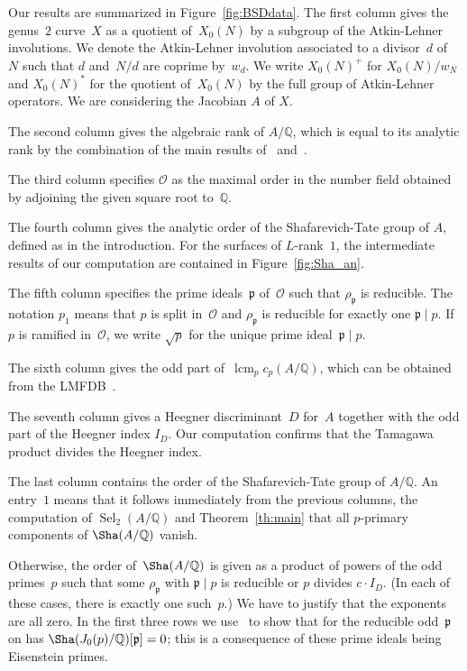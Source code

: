 \documentclass{amsart}
\newcommand{\Q}{{\mathbb{Q}}}
\newcommand{\pfr}{{\mathfrak{p}}}
\newcommand{\Ocal}{{\mathcal{O}}}
\newcommand{\Sel}{\operatorname{Sel}}
\newcommand{\lcm}{\operatorname{lcm}}
\begin{document}
	Our results are summarized in Figure~\ref{fig:BSDdata}. The first column
	gives the genus~$2$ curve~$X$ as a quotient of~$X_0(N)$ by a subgroup of the Atkin-Lehner
	involutions. We denote the Atkin-Lehner involution associated to
	a divisor~$d$ of~$N$ such that $d$ and~$N/d$ are coprime by~$w_d$.
	We write $X_0(N)^+$ for $X_0(N)/w_N$ and $X_0(N)^*$ for the
	quotient of~$X_0(N)$ by the full group of Atkin-Lehner operators.
	We are considering the Jacobian $A$ of $X$.
	
	The second column gives the algebraic rank of $A/\Q$, which is equal to its analytic rank
	by the combination of the main results of~\cite{GrossZagier1986} and~\cite{KolyvaginLogachev}.
	
	The third column specifies $\Ocal$ as the maximal order in the number field obtained
	by adjoining the given square root to~$\Q$.
	
	The fourth column gives the analytic order of the Shafarevich-Tate group of $A$,
	defined as in the introduction. For the surfaces of $L$-rank~$1$, the intermediate
	results of our computation are contained in Figure~\ref{fig:Sha_an}.
	
	The fifth column specifies the prime ideals~$\pfr$ of~$\Ocal$ such that $\rho_\pfr$
	is reducible. The notation $p_1$ means that $p$ is split in~$\Ocal$ and $\rho_\pfr$
	is reducible for exactly one $\pfr \mid p$. If $p$ is ramified in~$\Ocal$, we write
	$\sqrt{p}$ for the unique prime ideal~$\pfr \mid p$.
	
	The sixth column gives the odd part of~$\lcm_p c_p(A/\Q)$, which can be obtained from
	the LMFDB~\cite{LMFDB}.
	
	The seventh column gives a Heegner discriminant~$D$ for~$A$ together with 
	the odd part
	of the Heegner index $I_D$.
	Our computation confirms that the Tamagawa product divides the Heegner index.
	
	The last column contains the order of the Shafarevich-Tate group of $A/\Q$.
	An entry~$1$ means that it follows immediately from the previous columns,
	the computation of $\Sel_2(A/\Q)$ and Theorem~\ref{th:main}
	that all $p$-primary components of $\Sha(A/\Q)$ vanish.
	
	Otherwise, the order
	of~$\Sha(A/\Q)$ is given as a product of powers of the odd primes~$p$ such that
	some $\rho_\pfr$ with $\pfr \mid p$ is reducible or $p$ divides $c \cdot I_D$.
	(In each of these cases, there is exactly one such~$p$.)
	We have to justify that the exponents are all zero.
	In the first three rows we use~\cite{Mazur1978} to show that for the reducible
	odd~$\pfr$ on has $\Sha(J_0(p)/\Q)[\pfr] = 0$; this is a consequence of 
	these prime
	ideals being Eisenstein primes.
	
\end{document}
